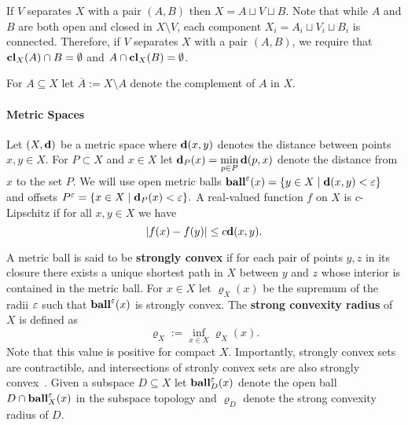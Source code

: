 If $V$ separates $X$ with a pair $(A, B)$ then $X = A\sqcup V\sqcup B$.
Note that while $A$ and $B$ are both open and closed in $X\setminus V$, each component $X_i = A_i\sqcup V_i\sqcup B_i$ is connected.
Therefore, if $V$ separates $X$ with a pair $(A, B)$, we require that $\mathbf{cl}_X(A)\cap B = \emptyset$ and $A\cap \mathbf{cl}_X(B) = \emptyset$.

For $A\subseteq X$ let $\overline{A} := X\setminus A$ denote the complement of $A$ in $X$.

\paragraph{Metric Spaces}

Let $(X,\mathbf{d})$ be a metric space where $\mathbf{d}(x, y)$ denotes the distance between points $x,y\in X$.
For $P\subset X$ and $x\in X$ let $\mathbf{d}_P(x) = \displaystyle\min_{p\in P}\mathbf{d}(p, x)$ denote the distance from $x$ to the set $P$.
We will use open metric balls $\mathbf{ball}^\varepsilon(x) = \{y\in X\mid \mathbf{d}(x, y) < \varepsilon\}$ and offsets $P^\varepsilon = \{x\in X\mid \mathbf{d}_P(x) < \varepsilon\}.$
A real-valued function $f$ on $X$ is $c$-Lipschitz if for all $x,y\in X$ we have
\[
  |f(x) - f(y)| \le c \mathbf{d}(x,y).
\]

A metric ball is said to be \textbf{strongly convex} if for each pair of points $y,z$ in its closure there exists a unique shortest path in $X$ between $y$ and $z$ whose interior is contained in the metric ball.
For $x\in X$ let $\varrho_X(x)$ be the supremum of the radii $\varepsilon$ such that $\mathbf{ball}^\varepsilon(x)$ is strongly convex.
The \textbf{strong convexity radius} of $X$ is defined as
\[ \varrho_X := \inf_{x\in X} \varrho_X(x).\]
Note that this value is positive for compact $X$.
Importantly, strongly convex sets are contractible, and intersections of stronly convex sets are also strongly convex~\cite{chazal09analysis}.
Given a subspace $D\subseteq X$ let $\mathbf{ball}_D^\varepsilon(x)$ denote the open ball $D\cap \mathbf{ball}_X^\varepsilon(x)$ in the subspace topology and $\varrho_D$ denote the strong convexity radius of $D$.
